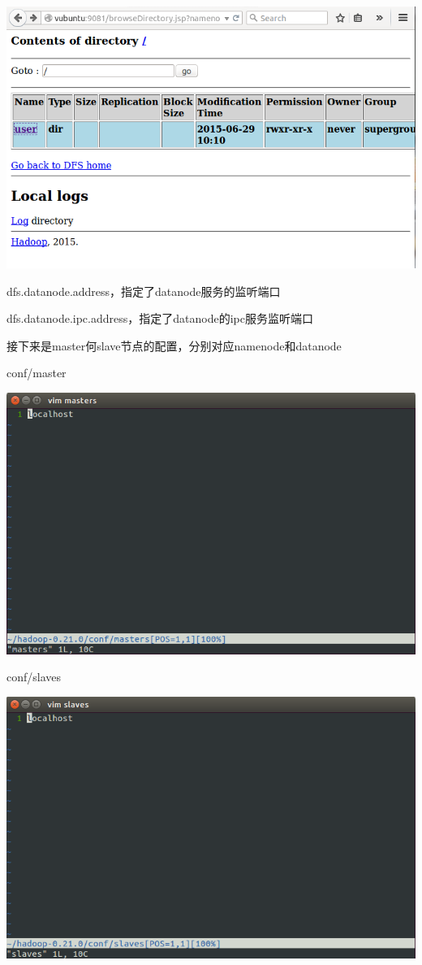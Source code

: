 \includegraphics[width=\textwidth]{image/env/cr12.png}

dfs.datanode.address，指定了datanode服务的监听端口

dfs.datanode.ipc.address，指定了datanode的ipc服务监听端口

接下来是master何slave节点的配置，分别对应namenode和datanode

conf/master

\includegraphics[width=\textwidth]{image/env/cr13.png}

conf/slaves

\includegraphics[width=\textwidth]{image/env/cr14.png}

